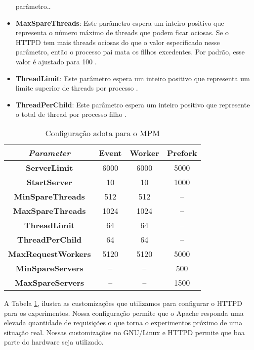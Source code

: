 \begin{itemize}
        parâmetro.\cite{mpm_minsparethreads}.
  \item \textbf{MaxSpareThreads}: Este parâmetro espera um inteiro positivo que
        representa o número máximo de threads que podem ficar ociosas. Se o
        HTTPD tem mais threads ociosas do que o valor especificado nesse
        parâmetro, então o processo pai mata os filhos excedentes. Por padrão,
        esse valor é ajustado para 100 \cite{mpm_maxsparethreads}.
  \item \textbf{ThreadLimit}: Este parâmetro espera um inteiro positivo que
        representa um limite superior de threads por processo
        \cite{mpm_threadlimits}.
  \item \textbf{ThreadPerChild}: Este parâmetro espera um inteiro positivo que
        represente o total de thread por processo filho
        \cite{mpm_threadperchild}.
\end{itemize}

\begin{table}
  \centering
  \begin{tabular}{|c|c|c|c|}
    \hline
    \textit{Parameter} & \textbf{Event} & \textbf{Worker} & \textbf{Prefork} \\
    \hline
    \textbf{ServerLimit} & 6000 & 6000 & 5000\\
    \hline
    \textbf{StartServer} & 10 & 10 & 1000\\
    \hline
    \textbf{MinSpareThreads} & 512 & 512 & --\\
    \hline
    \textbf{MaxSpareThreads} & 1024 & 1024 & --\\
    \hline
    \textbf{ThreadLimit} & 64 & 64 & --\\
    \hline
    \textbf{ThreadPerChild} & 64 & 64 & --\\
    \hline
    \textbf{MaxRequestWorkers} & 5120 & 5120 & 5000\\
    \hline
    \textbf{MinSpareServers} & -- & -- & 500\\
    \hline
    \textbf{MaxSpareServers} & -- & -- & 1500\\
    \hline
  \end{tabular}
  \caption{Configuração adota para o MPM}
  \label{tab:configuration}
\end{table}

A Tabela \ref{tab:configuration}, ilustra as customizações que utilizamos para
configurar o HTTPD para os experimentos. Nossa configuração permite que o
Apache responda uma elevada quantidade de requisições o que torna o
experimentos próximo de uma situação real. Nossas customizações no GNU/Linux e
HTTPD permite que boa parte do hardware seja utilizado.

